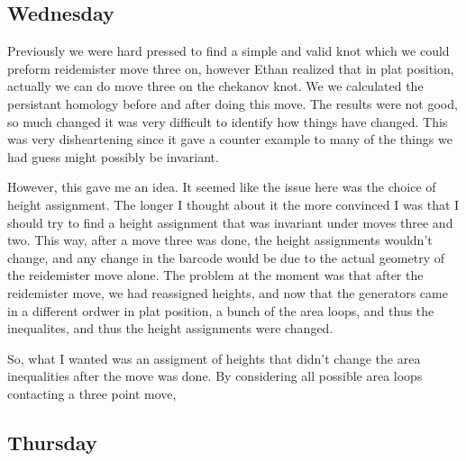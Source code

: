 \documentclass[11pt,oneside]{amsart}
\begin{document}
\subsection{Wednesday}

Previously we were hard pressed to find a simple and valid knot which we could preform reidemister move three on, however Ethan realized that in plat position, actually we can do move three on the chekanov knot. We we calculated the persistant homology before and after doing this move. The results were not good, so much changed it was very difficult to identify how things have changed. This was very disheartening since it gave a counter example to many of the things we had guess might possibly be invariant. 

However, this gave me an idea. It seemed like the issue here was the choice of height assignment. The longer I thought about it the more convinced I was that I should try to find a height assignment that was invariant under moves three and two. This way, after a move three was done, the height assignments wouldn't change, and any change in the barcode would be due to the actual geometry of the reidemister move alone. The problem at the moment was that after the reidemister move, we had reassigned heights, and now that the generators came in a different ordwer in plat position, a bunch of the area loops, and thus the inequalites, and thus the height assignments were changed. 

So, what I wanted was an assigment of heights that didn't change the area inequalities after the move was done. By considering all possible area loops contacting a three point move, 



\subsection{Thursday}
\end{document}
